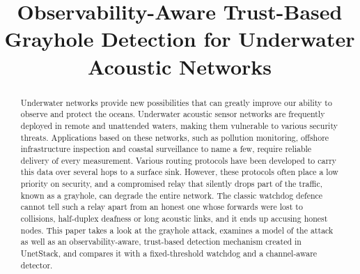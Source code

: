 \documentclass[conference]{IEEEtran}
\begin{document}
\title{Observability-Aware Trust-Based Grayhole Detection for Underwater Acoustic Networks}

\author{%
%
}
\maketitle

\begin{abstract}
Underwater networks provide new possibilities that can greatly improve our ability to observe and protect the oceans. Underwater acoustic sensor networks are frequently deployed in remote and unattended waters, making them vulnerable to various security threats. Applications based on these networks, such as pollution monitoring, offshore infrastructure inspection and coastal surveillance to name a few, require reliable delivery of every measurement. Various routing protocols have been developed to carry this data over several hops to a surface sink. However, these protocols often place a low priority on security, and a compromised relay that silently drops part of the traffic, known as a grayhole, can degrade the entire network. The classic watchdog defence cannot tell such a relay apart from an honest one whose forwards were lost to collisions, half-duplex deafness or long acoustic links, and it ends up accusing honest nodes. This paper takes a look at the grayhole attack, examines a model of the attack as well as an observability-aware, trust-based detection mechanism created in UnetStack, and compares it with a fixed-threshold watchdog and a channel-aware detector.
\end{abstract}
\end{document}

